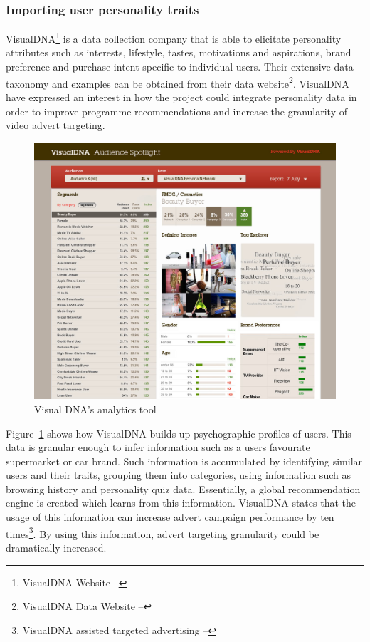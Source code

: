	\subsubsection{Importing user personality traits}
	VisualDNA\footnote{VisualDNA Website -- } is a data collection company that is able to elicitate personality attributes such as interests, lifestyle, tastes, motivations and aspirations, brand preference and purchase intent specific to individual users. Their extensive data taxonomy and examples can be obtained from their data website\footnote{VisualDNA Data Website -- }. VisualDNA have expressed an interest in how the project could integrate personality data in order to improve programme recommendations and increase the granularity of video advert targeting.

	\begin{figure}[H]
		\centering
		\includegraphics[width=\textwidth]{images/visualdna.jpg}
		\caption[Caption for LOF]{Visual DNA's analytics tool\footnotemark}
		\label{fig:visualdna}
	\end{figure}

	Figure~\ref{fig:visualdna} shows how VisualDNA builds up psychographic profiles of users. This data is granular enough to infer information such as a users favourate supermarket or car brand. Such information is accumulated by identifying similar users and their traits, grouping them into categories, using information such as browsing history and personality quiz data. Essentially, a global recommendation engine is created which learns from this information. VisualDNA states that the usage of this information can increase advert campaign performance by ten times\footnote{VisualDNA assisted targeted advertising -- }. By using this information, advert targeting granularity could be dramatically increased.

